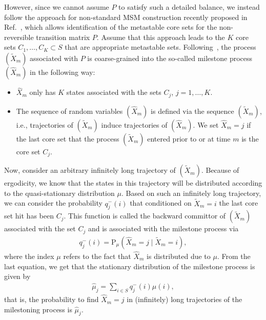\documentclass[journal=jctcce,manuscript=article]{achemso}
\newcommand{\recheck}[1]{{\color{red} #1}}
\newcommand{\bwd}[0]{-}
\newcommand{\prob}{\textrm{P}}
\begin{document}
However, since we cannot assume $P$ to satisfy such a detailed balance, we
instead follow the approach for non-standard MSM construction recently proposed in Ref.~\cite{sarich2014utilizing}, which allows  identification of the metastable core sets for the
non-reversible transition matrix $P$. Assume that this approach leads
to the $K$ core sets $C_1,\ldots, C_K\subset S$ that are appropriate metastable sets. 
Following~\cite{A19-31,schuette2011markov}, the process $(\tilde X_m)$ associated with $P$ is coarse-grained into the so-called milestone process $(\hat{X}_m)$ in the following way: 
\begin{itemize}
\item $\hat{X}_m$ only has $K$ states associated with the sets $C_j$, $j=1,\ldots,K$. 
\item The sequence of random variables $(\hat{X}_m)$ is defined via the sequence $(\tilde X_m)$, i.e., trajectories of $(\tilde X_m)$ induce trajectories of $(\hat{X}_m)$. We set $\hat{X}_m=j$ if the last core set that the process $(\tilde X_m)$ entered prior to or at time $m$ is the core set $C_j$.
\end{itemize}
Now, consider an arbitrary infinitely long trajectory of $(\tilde X_m)$. Because of ergodicity, we know that the states in this trajectory will be distributed according to the quasi-stationary distribution $\mu$. Based on such an infinitely long trajectory, we can consider the probability $q_j^\bwd(i)$ that conditioned on $\tilde X_m=i$ the last core set hit has been $C_j$.
This function is called the backward committor of $(\tilde X_m)$ associated with the set $C_j$ and is associated with the milestone process via
\begin{align}
\label{eq:msm-bwd-committor}  
q^\bwd_j(i)=\prob_\mu(\hat{X}_m=j \mid \tilde X_m=i),
\end{align}
where  the index $\mu$ refers to the fact that $\hat{X}_m$ is distributed due to $\mu$.
From the last equation, we get that the stationary distribution of the milestone process is given by
\begin{align}  
\hat{\mu}_j=\sum_{i\in S} q^\bwd_j(i)\mu(i),
\end{align}
that is, the probability to find $\hat{X}_m=j$ in (infinitely) long trajectories of the milestoning process is $\hat{\mu}_j$.
\end{document}
